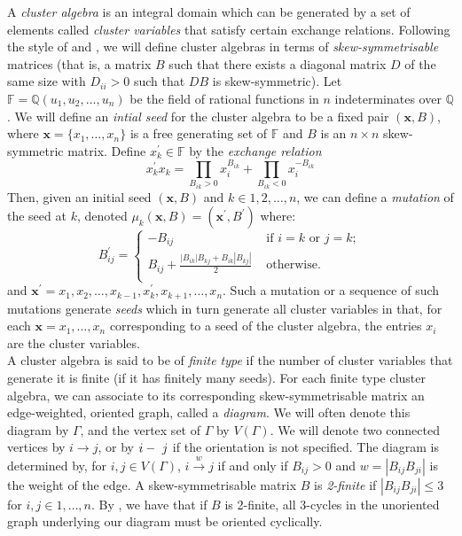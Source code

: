 \documentclass[11pt]{amsart}
\theoremstyle{definition}
\newcommand\V{V(\Gamma)}
\begin{document}
A \textit{cluster algebra} is an integral domain which can be generated by a set of elements called \textit{cluster variables} that satisfy certain exchange relations. Following the style of \cite{FZ02} and \cite{BM13}, we will define cluster algebras in terms of \textit{skew-symmetrisable} matrices (that is, a matrix $B$ such that there exists a diagonal matrix $D$ of the same size with $D_{ii} >0$ such that $DB$ is skew-symmetric). Let $\mathbb{F} = \mathbb{Q}(u_1, u_2, \ldots, u_n)$ be the field of rational functions in $n$ indeterminates over $\mathbb{Q}$. We will define an \textit{intial seed} for the cluster algebra to be a fixed pair $(\textbf{x}, B)$, where $\textbf{x} = \{x_1, \ldots, x_n\}$ is a free generating set of $\mathbb{F}$ and $B$ is an $n \times n$ skew-symmetric matrix. Define $x_k^{\prime} \in \mathbb{F}$ by the \textit{exchange relation}
\begin{displaymath}
x_k^{\prime}x_k = \prod_{B_{ik} > 0}{x_i^{B_{ik}}} + \prod_{B_{ik} < 0}{x_i^{-B_{ik}}}
\end{displaymath}
Then, given an initial seed $(\textbf{x}, B)$ and $k \in {1,2,\ldots,n}$, we can define a \textit{mutation} of the seed at $k$, denoted $\mu_k(\boldsymbol{x}, B) = (\textbf{x}^{\prime}, B^{\prime})$ where:
\begin{displaymath}
B_{ij}^{\prime} = \begin{cases} - B_{ij} & \mbox{ if } i = k \mbox{ or } j = k;\\
																B_{ij} + \frac{|B_{ik}|B_{kj} + B_{ik}|B_{kj}|}{2} & \mbox{ otherwise. }\\
									\end{cases}
\end{displaymath}
and $\textbf{x}^{\prime} = {x_1, x_2, \ldots, x_{k-1}, x_k^{\prime}, x_{k+1}, \ldots, x_n}$. 
Such a mutation or a sequence of such mutations generate \textit{seeds} which in turn generate all cluster variables in that, for each $\textbf{x} = {x_1, \ldots, x_n}$ corresponding to a seed of the cluster algebra, the entries $x_i$ are the cluster variables. \\

 A cluster algebra is said to be of \textit{finite type} if the number of cluster variables that generate it is finite (if it has finitely many seeds). For each finite type cluster algebra, we can associate to its corresponding skew-symmetrisable matrix an edge-weighted, oriented graph, called a \textit{diagram}. We will often denote this diagram by $\Gamma$, and the vertex set of $\Gamma$ by $\V$. We will denote two connected vertices by $i \rightarrow j$, or by $i\--\ j$ if the orientation is not specified. The diagram is determined by, for $i, j \in \V$, $i \xrightarrow{w} j$ if and only if $B_{ij} > 0$ and $w = |B_{ij}B_{ji}|$ is the weight of the edge. A skew-symmetrisable matrix $B$ is \textit{2-finite} if $|B_{ij}B_{ji}| \leq 3$ for $i, j \in {1, \ldots, n}$.  By \cite[7.5]{FZ02}, we have that if $B$ is 2-finite, all 3-cycles in the unoriented graph underlying our diagram must be oriented cyclically. \\
\end{document}
